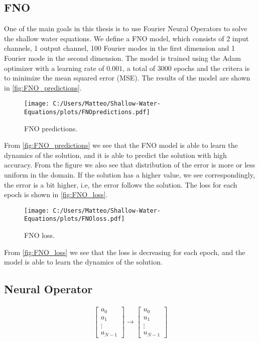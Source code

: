 \subsection{FNO}
One of the main goals in this thesis is to use Fourier Neural Operators to solve the shallow water equations.
We define a FNO model, which consists of 2 input channels, 1 output channel, 100 Fourier modes in the first dimension and 1 Fourier mode in the second dimension.
The model is trained using the Adam optimizer with a learning rate of $0.001$, a total of $3000$ epochs and the critera is to minimize the mean squared error (MSE).
The results of the model are shown in \autoref{fig:FNO_predictions}.
\begin{figure}[H]
    \centering
    \texttt{[image: C:/Users/Matteo/Shallow-Water-Equations/plots/FNOpredictions.pdf]}
    \caption{FNO predictions.}\label{fig:FNO_predictions}
\end{figure}
From \autoref{fig:FNO_predictions} we see that the FNO model is able to learn the dynamics of the solution, and it is able to predict the solution with high accuracy.
From the figure we also see that distribution of the error is more or less uniform in the domain. If the solution has a higher value, we see correspondingly, the error is a bit higher, i.e, the error follows the solution.
The loss for each epoch is shown in \autoref{fig:FNO_loss}.
\begin{figure}[H]
    \centering
    \texttt{[image: C:/Users/Matteo/Shallow-Water-Equations/plots/FNOloss.pdf]}
    \caption{FNO loss.}\label{fig:FNO_loss}
\end{figure}
From \autoref{fig:FNO_loss} we see that the loss is decreasing for each epoch, and the model is able to learn the dynamics of the solution.


\subsection{Neural Operator}

\begin{align*}
    \begin{bmatrix}
        a_0 \\
        a_1 \\
        \vdots \\
        a_{N-1}
    \end{bmatrix}
    \to
    \begin{bmatrix}
        u_0 \\
        u_1 \\
        \vdots \\
        u_{N-1}
    \end{bmatrix}
\end{align*}

